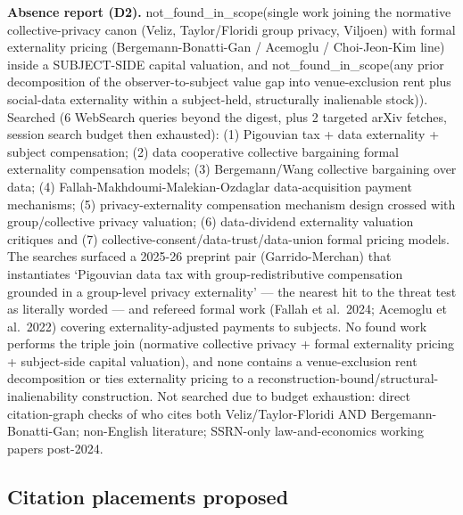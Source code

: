 \documentclass[
  11pt,
]{article}
\newcounter{none} %
\begin{document}
\textbf{Absence report (D2).} not\_found\_in\_scope(single work joining
the normative collective-privacy canon (Veliz, Taylor/Floridi group
privacy, Viljoen) with formal externality pricing (Bergemann-Bonatti-Gan
/ Acemoglu / Choi-Jeon-Kim line) inside a SUBJECT-SIDE capital
valuation, and not\_found\_in\_scope(any prior decomposition of the
observer-to-subject value gap into venue-exclusion rent plus social-data
externality within a subject-held, structurally inalienable stock)).
Searched (6 WebSearch queries beyond the digest, plus 2 targeted arXiv
fetches, session search budget then exhausted): (1) Pigouvian tax + data
externality + subject compensation; (2) data cooperative collective
bargaining formal externality compensation models; (3) Bergemann/Wang
collective bargaining over data; (4) Fallah-Makhdoumi-Malekian-Ozdaglar
data-acquisition payment mechanisms; (5) privacy-externality
compensation mechanism design crossed with group/collective privacy
valuation; (6) data-dividend externality valuation critiques and (7)
collective-consent/data-trust/data-union formal pricing models. The
searches surfaced a 2025-26 preprint pair (Garrido-Merchan) that
instantiates `Pigouvian data tax with group-redistributive compensation
grounded in a group-level privacy externality' --- the nearest hit to
the threat test as literally worded --- and refereed formal work (Fallah
et al.~2024; Acemoglu et al.~2022) covering externality-adjusted
payments to subjects. No found work performs the triple join (normative
collective privacy + formal externality pricing + subject-side capital
valuation), and none contains a venue-exclusion rent decomposition or
ties externality pricing to a
reconstruction-bound/structural-inalienability construction. Not
searched due to budget exhaustion: direct citation-graph checks of who
cites both Veliz/Taylor-Floridi AND Bergemann-Bonatti-Gan; non-English
literature; SSRN-only law-and-economics working papers post-2024.

\subsection{Citation placements
proposed}\label{citation-placements-proposed}
\end{document}
